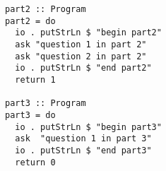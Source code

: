 \documentclass[10pt]{article}
\begin{document}
\begin{lstlisting}
part2 :: Program                                                                                                                                                                              
part2 = do                                                                                                                                                                                    
  io . putStrLn $ "begin part2"                                                                                                                                                               
  ask "question 1 in part 2"                                                                                                                                                                  
  ask "question 2 in part 2"                                                                                                                                                                  
  io . putStrLn $ "end part2"                                                                                                                                                                 
  return 1                                                                                                                                                                                    
                                                                                                                                                                                              
part3 :: Program                                                                                                                                                                              
part3 = do                                                                                                                                                                                    
  io . putStrLn $ "begin part3"                                                                                                                                                               
  ask  "question 1 in part 3"                                                                                                                                                                 
  io . putStrLn $ "end part3"                                                                                                                                                                 
  return 0
\end{lstlisting}
\end{document}
